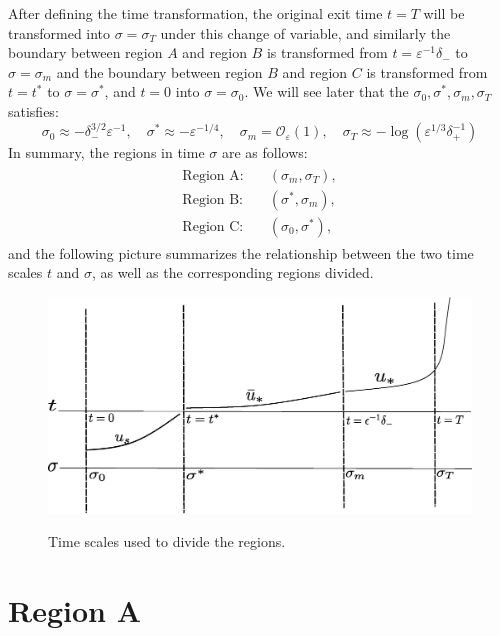 \documentclass[letterpaper,11pt]{article}
\newcommand{\rmO}{\mathcal{O}}
\newcommand{\eps}{\varepsilon}
\numberwithin{equation}{section}
\theoremstyle{plain}
\begin{document}
After defining the time transformation, the original exit time $t=T$ will be transformed into $\sigma=\sigma_T$ under this change of variable, and similarly the boundary between region $A$ and region $B$ is  transformed from $t=\eps^{-1}\delta_-$ to $\sigma = \sigma_m$ and the boundary between region $B$ and region $C$ is  transformed from $t=t^*$ to $\sigma = \sigma^*$, and $t=0$ into $\sigma = \sigma_0$. We will see later that the $\sigma_0, \sigma^*, \sigma_m, \sigma_T$ satisfies:
\[
\sigma _0 \approx -\delta_-^{3/2}\eps^{-1}, \quad \sigma ^* \approx -\eps^{-1/4}, \quad \sigma_m = \rmO_\eps(1), \quad
\sigma_T \approx -\log(\eps^{1/3}\delta_+^{-1}) 
\]
In summary, the regions in time $\sigma$ are as follows:
\begin{align}\label{region_division_sig}
\begin{split}
\text{Region A:} & \quad (\sigma_m ,\sigma_T ),  \\
\text{Region B:} & \quad (\sigma^*, \sigma_m),  \\
\text{Region C:} & \quad (\sigma_0, \sigma^*),
\end{split}
\end{align}
and the following picture summarizes the relationship between the two time scales $t$ and $\sigma$, as well as the corresponding regions divided. 

\begin{figure}[ht]
 \centering %
 \scalebox{0.6} %
 {\includegraphics[angle = 0, origin = c]{figures/time_scale.eps}} %
 \caption{Time scales used to divide the regions.}
\end{figure}\label{fig:time_scale} 


\section{Region A}\label{sec_A}
\end{document}
